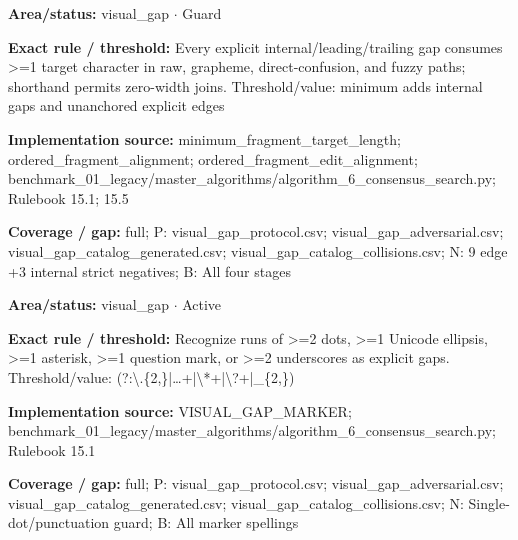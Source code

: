 \begin{tcolorbox}[enhanced,breakable,colback=white,colframe=Muted!45,boxrule=0.45pt,arc=1.5pt,left=6pt,right=6pt,top=5pt,bottom=5pt,title={\texttt{VG-HIDDEN-GAP-11}},title after break={\texttt{VG-HIDDEN-GAP-11}\ (continued)},fonttitle=\headingfont\bfseries\color{Navy},coltitle=Navy]
\textbf{Area/status:} visual\_\allowbreak{}gap $\boldsymbol{\cdot}$ Guard\par
\smallskip
\textbf{Exact rule / threshold:} Every explicit internal/\allowbreak{}leading/\allowbreak{}trailing gap consumes >=1 target character in raw, grapheme, direct-confusion, and fuzzy paths; shorthand permits zero-width joins. Threshold/\allowbreak{}value: minimum adds internal gaps and unanchored explicit edges\par
\smallskip
\textbf{Implementation source:} minimum\_\allowbreak{}fragment\_\allowbreak{}target\_\allowbreak{}length; ordered\_\allowbreak{}fragment\_\allowbreak{}alignment; ordered\_\allowbreak{}fragment\_\allowbreak{}edit\_\allowbreak{}alignment; benchmark\_\allowbreak{}01\_\allowbreak{}legacy/\allowbreak{}master\_\allowbreak{}algorithms/\allowbreak{}algorithm\_\allowbreak{}6\_\allowbreak{}consensus\_\allowbreak{}search.py; Rulebook 15.1; 15.5\par
\smallskip
\textbf{Coverage / gap:} full; P: visual\_\allowbreak{}gap\_\allowbreak{}protocol.csv; visual\_\allowbreak{}gap\_\allowbreak{}adversarial.csv; visual\_\allowbreak{}gap\_\allowbreak{}catalog\_\allowbreak{}generated.csv; visual\_\allowbreak{}gap\_\allowbreak{}catalog\_\allowbreak{}collisions.csv; N: 9 edge +3 internal strict negatives; B: All four stages
\end{tcolorbox}
\begin{tcolorbox}[enhanced,breakable,colback=white,colframe=Muted!45,boxrule=0.45pt,arc=1.5pt,left=6pt,right=6pt,top=5pt,bottom=5pt,title={\texttt{VG-MARKERS-01}},title after break={\texttt{VG-MARKERS-01}\ (continued)},fonttitle=\headingfont\bfseries\color{Navy},coltitle=Navy]
\textbf{Area/status:} visual\_\allowbreak{}gap $\boldsymbol{\cdot}$ Active\par
\smallskip
\textbf{Exact rule / threshold:} Recognize runs of >=2 dots, >=1 Unicode ellipsis, >=1 asterisk, >=1 question mark, or >=2 underscores as explicit gaps. Threshold/\allowbreak{}value: (?:\textbackslash{}.\{2,\}|…+|\textbackslash{}*+|\textbackslash{}?+|\_\allowbreak{}\{2,\})\par
\smallskip
\textbf{Implementation source:} VISUAL\_\allowbreak{}GAP\_\allowbreak{}MARKER; benchmark\_\allowbreak{}01\_\allowbreak{}legacy/\allowbreak{}master\_\allowbreak{}algorithms/\allowbreak{}algorithm\_\allowbreak{}6\_\allowbreak{}consensus\_\allowbreak{}search.py; Rulebook 15.1\par
\smallskip
\textbf{Coverage / gap:} full; P: visual\_\allowbreak{}gap\_\allowbreak{}protocol.csv; visual\_\allowbreak{}gap\_\allowbreak{}adversarial.csv; visual\_\allowbreak{}gap\_\allowbreak{}catalog\_\allowbreak{}generated.csv; visual\_\allowbreak{}gap\_\allowbreak{}catalog\_\allowbreak{}collisions.csv; N: Single-dot/\allowbreak{}punctuation guard; B: All marker spellings
\end{tcolorbox}
